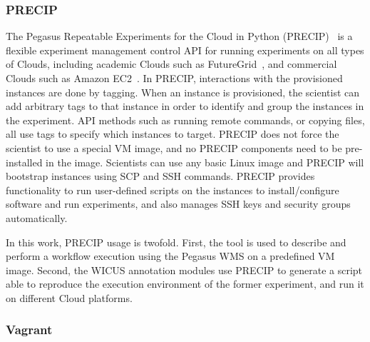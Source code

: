 \subsubsection{PRECIP}
The Pegasus Repeatable Experiments for the Cloud in Python (PRECIP)~\cite{Azarnoosh-CRC-2013} is a flexible experiment management control API for running experiments on all types of Clouds, including academic Clouds such as FutureGrid~\cite{futuregrid}, and commercial Clouds such as Amazon EC2~\cite{aws}. In PRECIP, interactions with the provisioned instances are done by tagging. When an instance is provisioned, the scientist can add arbitrary tags to that instance in order to identify and group the instances in the experiment. API methods such as running remote commands, or copying files, all use tags to specify which instances to target. PRECIP does not force the scientist to use a special VM image, and no PRECIP components need to be pre-installed in the image. Scientists can use any basic Linux image and PRECIP will bootstrap instances using SCP and SSH commands. PRECIP provides functionality to run user-defined scripts on the instances to install/configure software and run experiments, and also manages SSH keys and security groups automatically.

In this work, PRECIP usage is twofold. First, the tool is used to describe and perform a workflow execution using the Pegasus WMS on a predefined VM image. Second, the WICUS annotation modules use PRECIP to generate a script able to reproduce the execution environment of the former experiment, and run it on different Cloud platforms.


\subsubsection{Vagrant}

